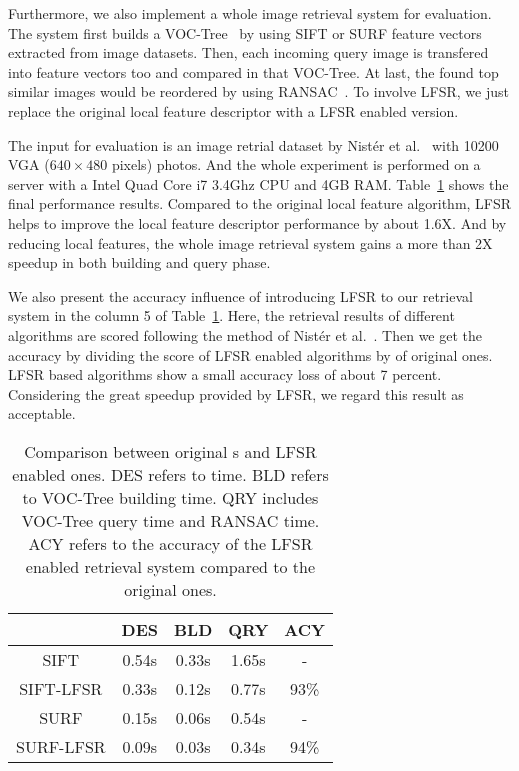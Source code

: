 Furthermore, we also implement a whole image retrieval system for evaluation. The system first builds a VOC-Tree~\cite{VOCTree2006} by using SIFT or SURF feature vectors extracted from image datasets. Then, each incoming query image is transfered into feature vectors too and compared in that VOC-Tree. At last, the found top similar images would be reordered by using RANSAC~\cite{ransac1981}. To involve LFSR, we just replace the original local feature descriptor with a LFSR enabled version.

The input for evaluation is an image retrial dataset by Nist\'er et al.~\cite{nister-stewenius-cvpr-2006} with 10200 VGA ($640\times480$ pixels) photos. And the whole experiment is performed on a server with a Intel Quad Core i7 3.4Ghz CPU and 4GB RAM. Table~\ref{tab:integration} shows the final performance results. Compared to the original local feature algorithm, LFSR helps to improve the local feature descriptor performance by about 1.6X. And by reducing local features, the whole image retrieval system gains a more than 2X speedup in both building and query phase.

We also present the accuracy influence of introducing LFSR to our retrieval system in the column 5 of Table~\ref{tab:integration}. Here, the retrieval results of different algorithms are scored following the method of Nist\'er et al.~\cite{nister-stewenius-cvpr-2006}. Then we get the accuracy by dividing the score of LFSR enabled algorithms by of original ones. LFSR based algorithms show a small accuracy loss of about 7 percent. Considering the great speedup provided by LFSR, we regard this result as acceptable.

\begin{table}
\begin{center}
\begin{tabular}{|c|c|c|c|c|}
\hline
 & DES & BLD & QRY & ACY \\
\hline\hline
SIFT & 0.54s & 0.33s & 1.65s & - \\
SIFT-LFSR & 0.33s & 0.12s & 0.77s & 93\% \\
\hline\hline
SURF & 0.15s & 0.06s & 0.54s & - \\
SURF-LFSR & 0.09s & 0.03s & 0.34s & 94\% \\
\hline
\end{tabular}
\end{center}
\caption{Comparison between original {\lfea}s and LFSR enabled ones. DES refers to {\lfea} time. BLD refers to VOC-Tree building time. QRY includes VOC-Tree query time and RANSAC time. ACY refers to the accuracy of the LFSR enabled retrieval system compared to the original ones.}
\label{tab:integration}
\end{table}